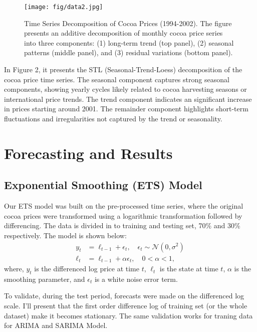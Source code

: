 \documentclass[10pt]{article}
\begin{document}
\begin{figure}[ht]
    \centering
    \captionsetup{font=scriptsize}
    \texttt{[image: fig/data2.jpg]}
    \caption{\scriptsize Time Series Decomposition of Cocoa Prices (1994-2002). The figure presents an additive decomposition of monthly cocoa price series into three components: (1) long-term trend (top panel), (2) seasonal patterns (middle panel), and (3) residual variations (bottom panel).}
    \label{fig:enter-label}
\end{figure}

\noindent
In Figure 2, it presents the STL (Seasonal-Trend-Loess) decomposition of the cocoa price time series. The seasonal component captures strong seasonal components, showing yearly cycles likely related to cocoa harvesting seasons or international price trends. The trend component indicates an significant increase in prices starting around 2001. The remainder component highlights short-term fluctuations and irregularities not captured by the trend or seasonality.


\newpage

\section{Forecasting and Results}
\subsection{Exponential Smoothing (ETS) Model}
Our ETS model was built on the pre-processed time series, where the original cocoa prices were transformed using a logarithmic transformation followed by differencing. The data is divided in to training and testing set, 70\% and 30\% respectively. The model is shown below:
\begin{align*}
    y_t &= \ell_{t-1} + \epsilon_t, \quad \epsilon_t \sim \mathcal{N}(0, \sigma^2) \\
    \ell_t &= \ell_{t-1} + \alpha \epsilon_t, \quad 0 < \alpha < 1,
\end{align*}
\noindent
where, $y_t$ is the differenced log price at time $t$, $\ell_t$ is the state at time $t$, $\alpha$ is the smoothing parameter, and $\epsilon_t$ is a white noise error term.

\noindent
To validate, during the test period, forecasts were made on the differenced log scale. I'll present that the first order difference log of training set (or the whole dataset) make it becomes stationary. The same validation works for traning data for ARIMA and SARIMA Model.
\end{document}
